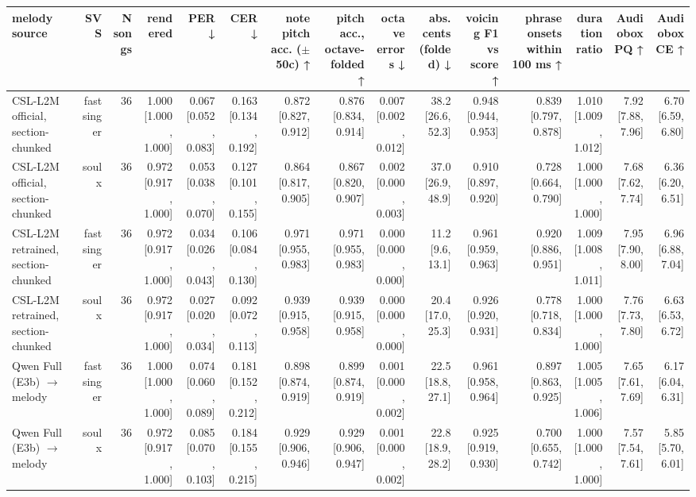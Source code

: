 \begin{table}[t]
\centering
\small
\begin{tabular}{lrrrrrrrrrrrrrr}
\toprule
melody source & SVS & N songs & rendered & PER ↓ & CER ↓ & note pitch acc. ($\pm$50c) ↑ & pitch acc., octave-folded ↑ & octave errors ↓ & abs. cents (folded) ↓ & voicing F1 vs score ↑ & phrase onsets within 100 ms ↑ & duration ratio & Audiobox PQ ↑ & Audiobox CE ↑ \\
\midrule
CSL-L2M official, section-chunked & fastsinger & 36 & 1.000 [1.000, 1.000] & 0.067 [0.052, 0.083] & 0.163 [0.134, 0.192] & 0.872 [0.827, 0.912] & 0.876 [0.834, 0.914] & 0.007 [0.002, 0.012] & 38.2 [26.6, 52.3] & 0.948 [0.944, 0.953] & 0.839 [0.797, 0.878] & 1.010 [1.009, 1.012] & 7.92 [7.88, 7.96] & 6.70 [6.59, 6.80] \\
CSL-L2M official, section-chunked & soulx & 36 & 0.972 [0.917, 1.000] & 0.053 [0.038, 0.070] & 0.127 [0.101, 0.155] & 0.864 [0.817, 0.905] & 0.867 [0.820, 0.907] & 0.002 [0.000, 0.003] & 37.0 [26.9, 48.9] & 0.910 [0.897, 0.920] & 0.728 [0.664, 0.790] & 1.000 [1.000, 1.000] & 7.68 [7.62, 7.74] & 6.36 [6.20, 6.51] \\
CSL-L2M retrained, section-chunked & fastsinger & 36 & 0.972 [0.917, 1.000] & 0.034 [0.026, 0.043] & 0.106 [0.084, 0.130] & 0.971 [0.955, 0.983] & 0.971 [0.955, 0.983] & 0.000 [0.000, 0.000] & 11.2 [9.6, 13.1] & 0.961 [0.959, 0.963] & 0.920 [0.886, 0.951] & 1.009 [1.008, 1.011] & 7.95 [7.90, 8.00] & 6.96 [6.88, 7.04] \\
CSL-L2M retrained, section-chunked & soulx & 36 & 0.972 [0.917, 1.000] & 0.027 [0.020, 0.034] & 0.092 [0.072, 0.113] & 0.939 [0.915, 0.958] & 0.939 [0.915, 0.958] & 0.000 [0.000, 0.000] & 20.4 [17.0, 25.3] & 0.926 [0.920, 0.931] & 0.778 [0.718, 0.834] & 1.000 [1.000, 1.000] & 7.76 [7.73, 7.80] & 6.63 [6.53, 6.72] \\
Qwen Full (E3b) $\rightarrow$ melody & fastsinger & 36 & 1.000 [1.000, 1.000] & 0.074 [0.060, 0.089] & 0.181 [0.152, 0.212] & 0.898 [0.874, 0.919] & 0.899 [0.874, 0.919] & 0.001 [0.000, 0.002] & 22.5 [18.8, 27.1] & 0.961 [0.958, 0.964] & 0.897 [0.863, 0.925] & 1.005 [1.005, 1.006] & 7.65 [7.61, 7.69] & 6.17 [6.04, 6.31] \\
Qwen Full (E3b) $\rightarrow$ melody & soulx & 36 & 0.972 [0.917, 1.000] & 0.085 [0.070, 0.103] & 0.184 [0.155, 0.215] & 0.929 [0.906, 0.946] & 0.929 [0.906, 0.947] & 0.001 [0.000, 0.002] & 22.8 [18.9, 28.2] & 0.925 [0.919, 0.930] & 0.700 [0.655, 0.742] & 1.000 [1.000, 1.000] & 7.57 [7.54, 7.61] & 5.85 [5.70, 6.01] \\

\end{tabular}
\end{table}
